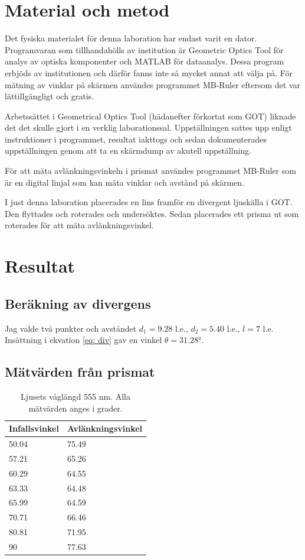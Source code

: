 \documentclass[a4paper]{article}
\begin{document}
\section{Material och metod}
Det fysiska materialet för denna laboration har endast varit en dator. Programvaran som tillhandahölls
av institution är Geometric Optics Tool för analys av optiska komponenter och MATLAB för dataanalys. 
Dessa program erbjöds av institutionen och därför fanns inte så mycket annat att välja på. För mätning
av vinklar på skärmen användes programmet MB-Ruler eftersom det var lättillgängligt och gratis.

Arbetssättet i Geometrical Optics Tool (hädanefter förkortat som GOT) liknade det det skulle gjort
i en verklig laborationssal. Uppställningen sattes upp enligt instruktioner i programmet, 
resultat iakttogs och sedan dokumenterades uppställningen genom att ta en skärmdump av akutell uppställning.

För att mäta avlänkningsvinkeln i prismat användes programmet MB-Ruler som är en digital linjal
som kan mäta vinklar och avstånd på skärmen.

I just denna laboration placerades en lins framför en divergent ljuskälla i GOT. Den flyttades och roterades och undersöktes.
Sedan placerades ett prisma ut som roterades för att mäta avlänkningsvinkel. 
\section{Resultat}
\subsection{Beräkning av divergens} \label{div}
Jag valde två punkter och avståndet $d_1 = 9.28$ l.e., $d_2 = 5.40$ l.e., $l = 7$ l.e.
Insättning i ekvation \ref{eq: div} gav en vinkel $\theta = \ang{31.28}$.

\subsection{Mätvärden från prismat}

\begin{table}[h]
    \begin{tabular}{|l|l|}
    \hline
    Infallsvinkel & Avlänkningsvinkel \\ \hline
    50.04         & 75.49             \\ \hline
    57.21         & 65.26             \\ \hline
    60.29         & 64.55             \\ \hline
    63.33         & 64.48             \\ \hline
    65.99         & 64.59             \\ \hline
    70.71         & 66.46             \\ \hline
    80.81         & 71.95             \\ \hline
    90            & 77.63             \\ \hline
    \end{tabular}
    \caption{Ljusets våglängd 555 nm. Alla mätvärden anges i grader.}
    \label{tb:555}
\end{table}
\end{document}
